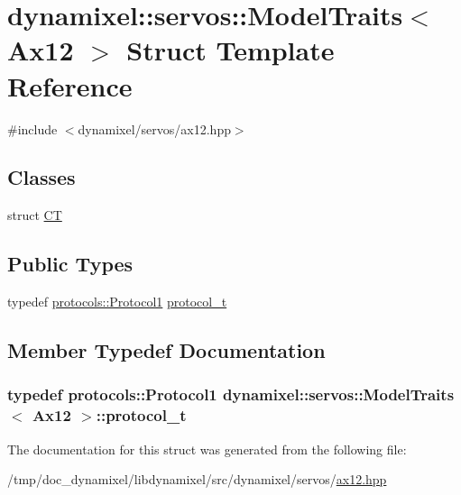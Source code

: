 \hypertarget{structdynamixel_1_1servos_1_1_model_traits_3_01_ax12_01_4}{}\section{dynamixel\+:\+:servos\+:\+:Model\+Traits$<$ Ax12 $>$ Struct Template Reference}
\label{structdynamixel_1_1servos_1_1_model_traits_3_01_ax12_01_4}


{\ttfamily \#include $<$dynamixel/servos/ax12.\+hpp$>$}

\subsection*{Classes}
\begin{DoxyCompactItemize}
\item 
struct \hyperlink{structdynamixel_1_1servos_1_1_model_traits_3_01_ax12_01_4_1_1_c_t}{C\+T}
\end{DoxyCompactItemize}
\subsection*{Public Types}
\begin{DoxyCompactItemize}
\item 
typedef \hyperlink{classdynamixel_1_1protocols_1_1_protocol1}{protocols\+::\+Protocol1} \hyperlink{structdynamixel_1_1servos_1_1_model_traits_3_01_ax12_01_4_a88d871f3f7b58c9bd9bb84da402237f8}{protocol\+\_\+t}
\end{DoxyCompactItemize}


\subsection{Member Typedef Documentation}
\hypertarget{structdynamixel_1_1servos_1_1_model_traits_3_01_ax12_01_4_a88d871f3f7b58c9bd9bb84da402237f8}{}
\subsubsection[{protocol\+\_\+t}]{\setlength{\rightskip}{0pt plus 5cm}typedef {\bf protocols\+::\+Protocol1} {\bf dynamixel\+::servos\+::\+Model\+Traits}$<$ {\bf Ax12} $>$\+::{\bf protocol\+\_\+t}}\label{structdynamixel_1_1servos_1_1_model_traits_3_01_ax12_01_4_a88d871f3f7b58c9bd9bb84da402237f8}


The documentation for this struct was generated from the following file\+:\begin{DoxyCompactItemize}
\item 
/tmp/doc\+\_\+dynamixel/libdynamixel/src/dynamixel/servos/\hyperlink{ax12_8hpp}{ax12.\+hpp}\end{DoxyCompactItemize}
